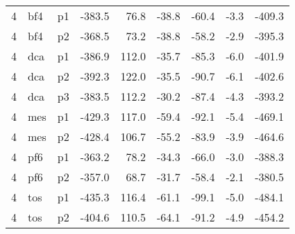 \documentclass[a4paper]{article}
\begin{document}
\begin{table}[ht]
\begin{tabular}{rllrrrrrr}
   4 & bf4 & p1 & -383.5 & 76.8 & -38.8 & -60.4 & -3.3 & -409.3 \\ 
   4 & bf4 & p2 & -368.5 & 73.2 & -38.8 & -58.2 & -2.9 & -395.3 \\ 
   4 & dca & p1 & -386.9 & 112.0 & -35.7 & -85.3 & -6.0 & -401.9 \\ 
   4 & dca & p2 & -392.3 & 122.0 & -35.5 & -90.7 & -6.1 & -402.6 \\ 
   4 & dca & p3 & -383.5 & 112.2 & -30.2 & -87.4 & -4.3 & -393.2 \\ 
   4 & mes & p1 & -429.3 & 117.0 & -59.4 & -92.1 & -5.4 & -469.1 \\ 
   4 & mes & p2 & -428.4 & 106.7 & -55.2 & -83.9 & -3.9 & -464.6 \\ 
   4 & pf6 & p1 & -363.2 & 78.2 & -34.3 & -66.0 & -3.0 & -388.3 \\ 
   4 & pf6 & p2 & -357.0 & 68.7 & -31.7 & -58.4 & -2.1 & -380.5 \\ 
   4 & tos & p1 & -435.3 & 116.4 & -61.1 & -99.1 & -5.0 & -484.1 \\ 
   4 & tos & p2 & -404.6 & 110.5 & -64.1 & -91.2 & -4.9 & -454.2 \\ 
   \hline
\end{tabular}
\end{table}
\end{document}

